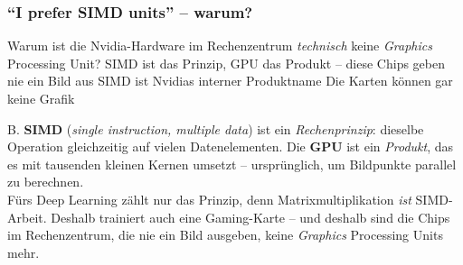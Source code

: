 \begin{frame}
  \frametitle{``I prefer SIMD units'' -- warum?\pruefungsfrage}

  \begin{mitmachfrage}
    Warum ist die Nvidia-Hardware im Rechenzentrum \emph{technisch} keine
    \emph{Graphics} Processing Unit?
             {SIMD ist das Prinzip, GPU das Produkt -- diese Chips geben nie ein Bild aus}%
             {SIMD ist Nvidias interner Produktname}%
             {Die Karten können gar keine Grafik}
  \end{mitmachfrage}
  \pause
  \vfill
  {\small
  \antwort B. \textbf{SIMD} (\emph{single instruction, multiple data}) ist ein
  \emph{Rechenprinzip}: dieselbe Operation gleichzeitig auf vielen Datenelementen. Die
  \textbf{GPU} ist ein \emph{Produkt}, das es mit tausenden kleinen Kernen umsetzt --
  ursprünglich, um Bildpunkte parallel zu berechnen.\\[4pt]
  Fürs Deep Learning zählt nur das Prinzip, denn Matrixmultiplikation \emph{ist}
  SIMD-Arbeit. Deshalb trainiert auch eine Gaming-Karte -- und deshalb sind die Chips im
  Rechenzentrum, die nie ein Bild ausgeben, keine \emph{Graphics} Processing Units mehr.}

\end{frame}

